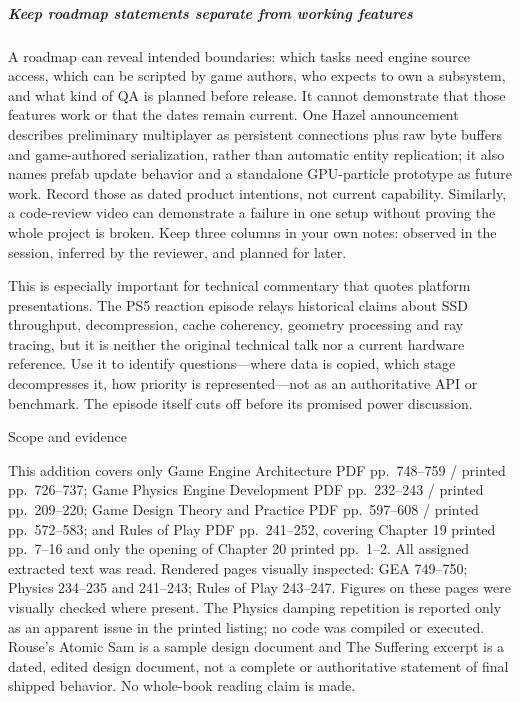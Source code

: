 \subparagraph{Keep roadmap statements separate from working features}\label{keep-roadmap-statements-separate-from-working-features}

A roadmap can reveal intended boundaries: which tasks need engine source access, which can be scripted by game authors, who expects to own a subsystem, and what kind of QA is planned before release. It cannot demonstrate that those features work or that the dates remain current. One Hazel announcement describes preliminary multiplayer as persistent connections plus raw byte buffers and game-authored serialization, rather than automatic entity replication; it also names prefab update behavior and a standalone GPU-particle prototype as future work. Record those as dated product intentions, not current capability. Similarly, a code-review video can demonstrate a failure in one setup without proving the whole project is broken. Keep three columns in your own notes: observed in the session, inferred by the reviewer, and planned for later.

This is especially important for technical commentary that quotes platform presentations. The PS5 reaction episode relays historical claims about SSD throughput, decompression, cache coherency, geometry processing and ray tracing, but it is neither the original technical talk nor a current hardware reference. Use it to identify questions---where data is copied, which stage decompresses it, how priority is represented---not as an authoritative API or benchmark. The episode itself cuts off before its promised power discussion.

Scope and evidence

This addition covers only Game Engine Architecture PDF pp.~748--759 / printed pp.~726--737; Game Physics Engine Development PDF pp.~232--243 / printed pp.~209--220; Game Design Theory and Practice PDF pp.~597--608 / printed pp.~572--583; and Rules of Play PDF pp.~241--252, covering Chapter 19 printed pp.~7--16 and only the opening of Chapter 20 printed pp.~1--2. All assigned extracted text was read. Rendered pages visually inspected: GEA 749--750; Physics 234--235 and 241--243; Rules of Play 243--247. Figures on these pages were visually checked where present. The Physics damping repetition is reported only as an apparent issue in the printed listing; no code was compiled or executed. Rouse's Atomic Sam is a sample design document and The Suffering excerpt is a dated, edited design document, not a complete or authoritative statement of final shipped behavior. No whole-book reading claim is made.

